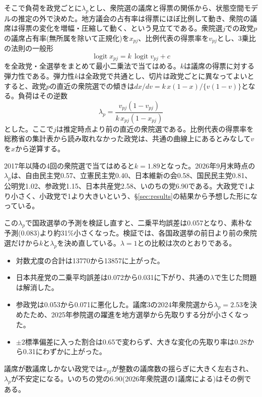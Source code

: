 \documentclass[a4paper,11pt]{ltjsarticle}
\begin{document}
そこで負荷を政党ごとに$\lambda_p$とし、衆院選の議席と得票の関係から、状態空間モデルの推定の外で決めた。地方議会の占有率は得票にほぼ比例して動き、衆院の議席は得票の変化を増幅・圧縮して動く、という見立てである。衆院選$j$での政党$p$の議席占有率(無所属を除いて正規化)を$x_{pj}$、比例代表の得票率を$v_{pj}$とし、3乗比の法則の一般形
\begin{equation}
  \operatorname{logit} x_{pj} = k\,\operatorname{logit} v_{pj} + c
\end{equation}
を全政党・全選挙をまとめて最小二乗法で当てはめる。$k$は議席の得票に対する弾力性である。弾力性$k$は全政党で共通とし、切片は政党ごとに異なってよいとすると、政党$p$の直近の衆院選での傾きは$dx/dv=k\,x(1-x)/\{v(1-v)\}$となる。負荷はその逆数
\begin{equation}
  \lambda_p = \frac{v_{pj}(1-v_{pj})}{k\,x_{pj}(1-x_{pj})}
\end{equation}
とした。ここで$j$は推定時点より前の直近の衆院選である。比例代表の得票率を総務省の集計表から読み取れなかった政党は、共通の曲線上にあるとみなして$v$を$x$から逆算する。

2017年以降の4回の衆院選で当てはめると$k=1.89$となった。2026年9月末時点の$\lambda_p$は、自由民主党0.57、立憲民主党0.40、日本維新の会0.58、国民民主党0.81、公明党1.02、参政党1.15、日本共産党2.58、いのちの党6.90である。大政党で1より小さく、小政党で1より大きいという、\S\ref{sec:results}の結果から予想した形になっている。

この$\lambda_p$で国政選挙の予測を検証し直すと、二乗平均誤差は0.057となり、素朴な予測(0.083)より約31\%小さくなった。検証では、各国政選挙の前日より前の衆院選だけから$k$と$\lambda_p$を決め直している。$\lambda=1$との比較は次のとおりである。
\begin{itemize}
  \item 対数尤度の合計は13770から13857に上がった。
  \item 日本共産党の二乗平均誤差は0.072から0.031に下がり、共通の$\lambda$で生じた問題は解消した。
  \item 参政党は0.053から0.071に悪化した。議席3の2024年衆院選から$\lambda_p=2.53$を決めたため、2025年参院選の躍進を地方選挙から先取りする分が小さくなった。
  \item $\pm2$標準偏差に入った割合は0.65で変わらず、大きな変化の先取り率は0.28から0.31にわずかに上がった。
\end{itemize}
議席が数議席しかない政党では$x_{pj}$が整数の議席数の揺らぎに大きく左右され、$\lambda_p$が不安定になる。いのちの党の6.90(2026年衆院選の1議席による)はその例である。
\end{document}
